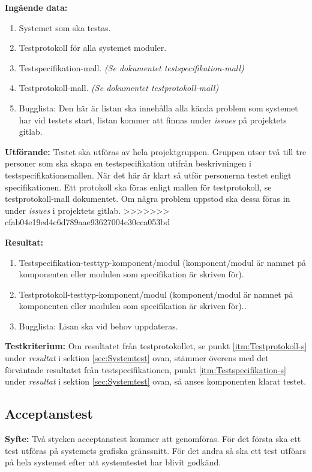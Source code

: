 \documentclass[a4paper,10pt]{article}
\begin{document}
\textbf{Ingående data:}
   \begin{enumerate}
       \item Systemet som ska testas.
       \item Testprotokoll för alla systemet moduler.
       \item Testspecifikation-mall. \emph{(Se dokumentet testspecifikation-mall)}
       \item Testprotokoll-mall. \emph{(Se dokumentet testprotokoll-mall)}
       \item Bugglista: Den här är listan ska innehålla alla kända problem som systemet har vid testets start, listan kommer att finnas under \emph{issues} på projektets gitlab.
   \end{enumerate}

\textbf{Utförande:} Testet ska utföras av hela projektgruppen. Gruppen utser två till tre personer som ska skapa en testspecifikation utifrån beskrivningen i testspecifikationsmallen. När det här är klart så utför personerna testet enligt specifikationen. Ett protokoll ska föras enligt mallen för testprotokoll, se testprotokoll-mall dokumentet. Om några problem uppstod ska dessa föras in under \emph{issues} i projektets gitlab.
>>>>>>> cfab04e19ed4c6d789aae93627004c30cca053bd

\textbf{Resultat:}
    \begin{enumerate}
        \item \label{itm:Testspecifikation-s} Testspecifikation-testtyp-komponent/modul (komponent/modul är namnet på komponenten eller modulen som specifikation är skriven för).
        \item \label{itm:Testprotokoll-s} Testprotokoll-testtyp-komponent/modul (komponent/modul är namnet på komponenten eller modulen som specifikation är skriven för)..
        \item Bugglista: Lisan ska vid behov uppdateras.
    \end{enumerate}

\textbf{Testkriterium:} Om resultatet från testprotokollet, se punkt \ref{itm:Testprotokoll-s} under \emph{resultat} i sektion \ref{sec:Systemtest} ovan, stämmer överens med det förväntade resultatet från testspecifikationen, punkt \ref{itm:Testspecifikation-s} under \emph{resultat} i sektion \ref{sec:Systemtest} ovan, så anses komponenten klarat testet.

\subsection{Acceptanstest}
\textbf{Syfte:}
Två stycken acceptanstest kommer att genomföras. För det första ska ett test utföras på systemets grafiska gränssnitt.  För det andra så ska ett test utföars på hela systemet efter att systemtestet har blivit godkänd.
\end{document}
